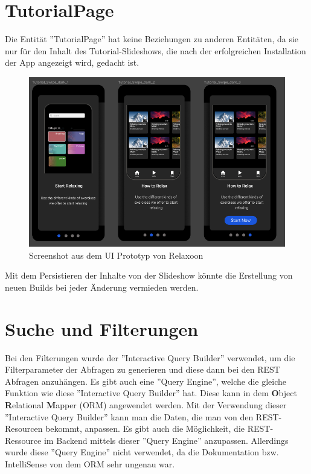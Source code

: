 \section{TutorialPage}
Die Entität ''TutorialPage'' hat keine Beziehungen zu anderen Entitäten, da sie nur für den Inhalt des Tutorial-Slideshows,
die nach der erfolgreichen Installation der App angezeigt wird, gedacht ist.

\begin{figure}[H]
  \centering
  \includegraphics[height=0.5\textwidth]{./pics/slideshow.png}
  \caption{Screenshot aus dem UI Prototyp von Relaxoon}
\end{figure}

Mit dem Persistieren der Inhalte von der Slideshow könnte die Erstellung
von neuen Builds bei jeder Änderung vermieden werden.


\section{Suche und Filterungen}

Bei den Filterungen wurde der ''Interactive Query Builder'' verwendet,
um die Filterparameter der Abfragen zu generieren
und diese dann bei den REST Abfragen anzuhängen.
Es gibt auch eine ''Query Engine'', welche die gleiche Funktion wie diese
''Interactive Query Builder'' hat.
Diese kann in dem \textbf{O}bject \textbf{R}elational \textbf{M}apper (ORM) angewendet werden.
Mit der Verwendung dieser ''Interactive Query Builder'' kann man die Daten,
die man von den REST-Resourcen bekommt, anpassen.
Es gibt auch die Möglichkeit, die REST-Ressource im Backend mittels dieser
''Query Engine'' anzupassen.
Allerdings wurde diese ''Query Engine'' nicht verwendet,
da die Dokumentation bzw. IntelliSense von dem ORM sehr ungenau war.

